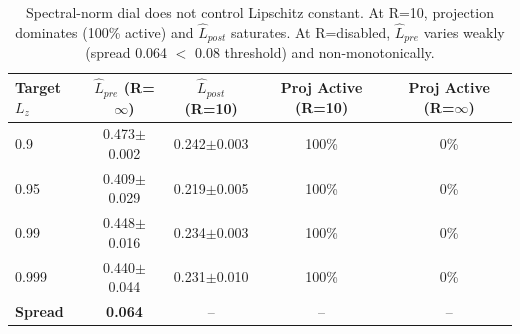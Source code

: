 \begin{table}[t]
\centering
\caption{Spectral-norm dial does not control Lipschitz constant. At R=10, projection dominates (100\% active) and $\hat{L}_{post}$ saturates. At R=disabled, $\hat{L}_{pre}$ varies weakly (spread 0.064 $<$ 0.08 threshold) and non-monotonically.}
\label{tab:exp2_dial_failure}
\begin{tabular}{lcccc}
\toprule
Target $L_z$ & $\hat{L}_{pre}$ (R=$\infty$) & $\hat{L}_{post}$ (R=10) & Proj Active (R=10) & Proj Active (R=$\infty$) \\
\midrule
  0.9 & 0.473$\pm$0.002 & 0.242$\pm$0.003 & 100\% & 0\% \\
  0.95 & 0.409$\pm$0.029 & 0.219$\pm$0.005 & 100\% & 0\% \\
  0.99 & 0.448$\pm$0.016 & 0.234$\pm$0.003 & 100\% & 0\% \\
  0.999 & 0.440$\pm$0.044 & 0.231$\pm$0.010 & 100\% & 0\% \\
\midrule
  \textbf{Spread} & \textbf{0.064} & -- & -- & -- \\
\bottomrule
\end{tabular}
\end{table}